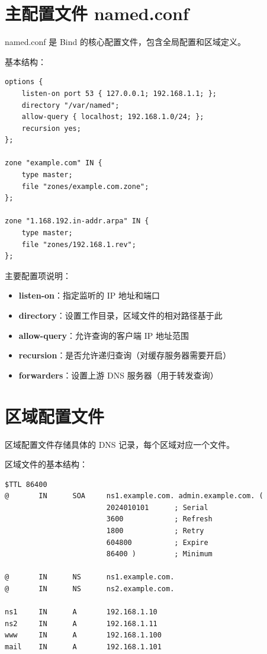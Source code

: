 \documentclass[12pt,UTF8]{ctexbook}
\begin{document}
\section{主配置文件 named.conf}
\label{sec:named_conf}

named.conf 是 Bind 的核心配置文件，包含全局配置和区域定义。

基本结构：
\begin{verbatim}
options {
    listen-on port 53 { 127.0.0.1; 192.168.1.1; };
    directory "/var/named";
    allow-query { localhost; 192.168.1.0/24; };
    recursion yes;
};

zone "example.com" IN {
    type master;
    file "zones/example.com.zone";
};

zone "1.168.192.in-addr.arpa" IN {
    type master;
    file "zones/192.168.1.rev";
};
\end{verbatim}

主要配置项说明：
\begin{itemize}
    \item \textbf{listen-on}：指定监听的 IP 地址和端口
    \item \textbf{directory}：设置工作目录，区域文件的相对路径基于此
    \item \textbf{allow-query}：允许查询的客户端 IP 地址范围
    \item \textbf{recursion}：是否允许递归查询（对缓存服务器需要开启）
    \item \textbf{forwarders}：设置上游 DNS 服务器（用于转发查询）
\end{itemize}

\section{区域配置文件}
\label{sec:zone_config}

区域配置文件存储具体的 DNS 记录，每个区域对应一个文件。

区域文件的基本结构：
\begin{verbatim}
$TTL 86400
@       IN      SOA     ns1.example.com. admin.example.com. (
                        2024010101      ; Serial
                        3600            ; Refresh
                        1800            ; Retry
                        604800          ; Expire
                        86400 )         ; Minimum

@       IN      NS      ns1.example.com.
@       IN      NS      ns2.example.com.

ns1     IN      A       192.168.1.10
ns2     IN      A       192.168.1.11
www     IN      A       192.168.1.100
mail    IN      A       192.168.1.101
\end{verbatim}
\end{document}
